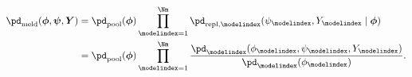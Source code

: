 \begin{align}
  \pd_{\text{meld}}(\boldsymbol{\phi}, \boldsymbol{\psi}, \boldsymbol{Y}) &=
    \pd_{\text{pool}}(\boldsymbol{\phi})
    \prod_{\modelindex = 1}^{\Nm}
      \pd_{\text{repl}, \modelindex}(\psi_{\modelindex}, Y_{\modelindex} \mid \boldsymbol{\phi}) \\
    &=
    \pd_{\text{pool}}(\boldsymbol{\phi})
    \prod_{\modelindex =1}^{\Nm}
    \frac {
      \pd_{\modelindex}(\phi_{\modelindex}, \psi_{\modelindex}, Y_{\modelindex})
    } {
      \pd_{\modelindex}(\phi_{\modelindex})
    }.
  \label{eqn:melded-model-full}
\end{align}